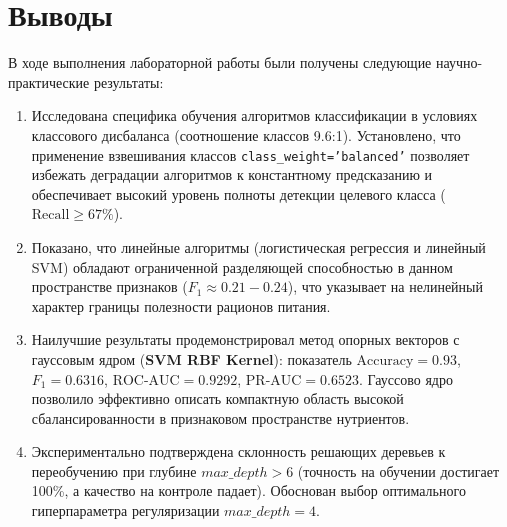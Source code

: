 \documentclass[14pt,a4paper]{extarticle}
\begin{document}
\section{Выводы}

В ходе выполнения лабораторной работы были получены следующие научно-практические результаты:
\begin{enumerate}
    \item Исследована специфика обучения алгоритмов классификации в условиях классового дисбаланса (соотношение классов 9.6:1). Установлено, что применение взвешивания классов \texttt{class\_weight='balanced'} позволяет избежать деградации алгоритмов к константному предсказанию и обеспечивает высокий уровень полноты детекции целевого класса ($\text{Recall} \ge 67\%$).
    \item Показано, что линейные алгоритмы (логистическая регрессия и линейный SVM) обладают ограниченной разделяющей способностью в данном пространстве признаков ($F_1 \approx 0.21 - 0.24$), что указывает на нелинейный характер границы полезности рационов питания.
    \item Наилучшие результаты продемонстрировал метод опорных векторов с гауссовым ядром (\textbf{SVM RBF Kernel}): показатель $\text{Accuracy} = 0.93$, $F_1 = 0.6316$, $\text{ROC-AUC} = 0.9292$, $\text{PR-AUC} = 0.6523$. Гауссово ядро позволило эффективно описать компактную область высокой сбалансированности в признаковом пространстве нутриентов.
    \item Экспериментально подтверждена склонность решающих деревьев к переобучению при глубине $max\_depth > 6$ (точность на обучении достигает 100\%, а качество на контроле падает). Обоснован выбор оптимального гиперпараметра регуляризации $max\_depth = 4$.
\end{enumerate}
\end{document}
